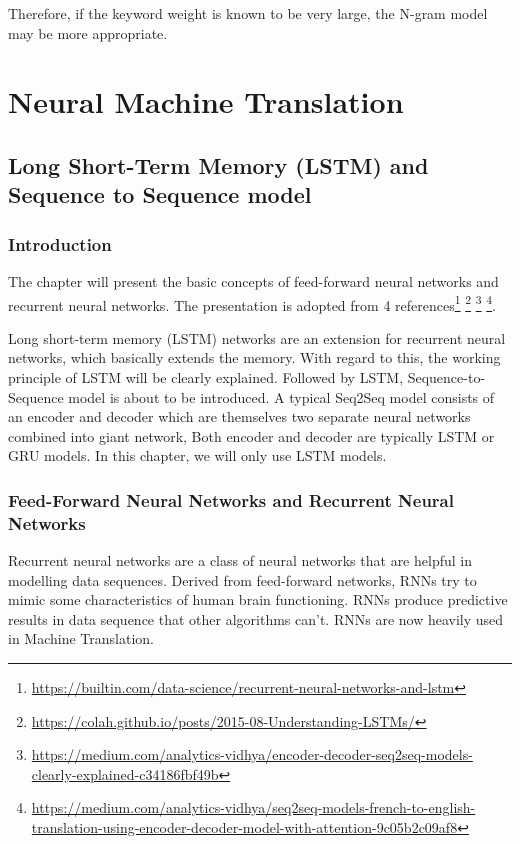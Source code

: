 Therefore, if the keyword weight is known to be very large, the N-gram model may be more appropriate.


\part{Neural Machine Translation}
\chapter{Long Short-Term Memory (LSTM) and Sequence to Sequence model}
\section*{Introduction}
The chapter will present the basic concepts of feed-forward neural networks and recurrent neural networks. The presentation is adopted from 4 references\footnote{\url{https://builtin.com/data-science/recurrent-neural-networks-and-lstm}} \footnote{\url{https://colah.github.io/posts/2015-08-Understanding-LSTMs/}} \footnote{\url{https://medium.com/analytics-vidhya/encoder-decoder-seq2seq-models-clearly-explained-c34186fbf49b}} \footnote{\url{https://medium.com/analytics-vidhya/seq2seq-models-french-to-english-translation-using-encoder-decoder-model-with-attention-9c05b2c09af8}}. 

Long short-term memory (LSTM) networks are an extension for recurrent neural networks, which basically extends the memory. With regard to this, the working principle of LSTM will be clearly explained. Followed by LSTM, Sequence-to-Sequence model is about to be introduced. A typical Seq2Seq model consists of an encoder and decoder which are themselves two separate neural networks combined into giant network, Both encoder and decoder are typically LSTM or GRU models. In this chapter, we will only use LSTM models. 

\minitoc

\section{Feed-Forward Neural Networks and Recurrent Neural Networks}
Recurrent neural networks are a class of neural networks that are helpful in modelling data sequences. Derived from feed-forward networks, RNNs try to mimic some characteristics of human brain functioning. RNNs produce predictive results in data sequence that other algorithms can't. RNNs are now heavily used in Machine Translation.

